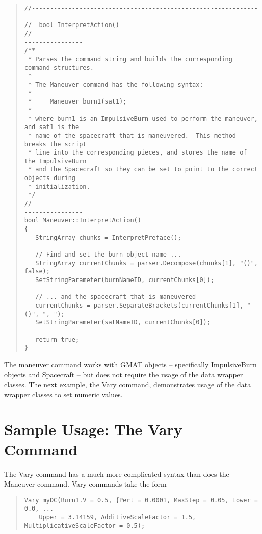 \begin{quote}
\begin{verbatim}
//------------------------------------------------------------------------------
//  bool InterpretAction()
//------------------------------------------------------------------------------
/**
 * Parses the command string and builds the corresponding command structures.
 *
 * The Maneuver command has the following syntax:
 *
 *     Maneuver burn1(sat1);
 *
 * where burn1 is an ImpulsiveBurn used to perform the maneuver, and sat1 is the
 * name of the spacecraft that is maneuvered.  This method breaks the script
 * line into the corresponding pieces, and stores the name of the ImpulsiveBurn
 * and the Spacecraft so they can be set to point to the correct objects during
 * initialization.
 */
//------------------------------------------------------------------------------
bool Maneuver::InterpretAction()
{
   StringArray chunks = InterpretPreface();

   // Find and set the burn object name ...
   StringArray currentChunks = parser.Decompose(chunks[1], "()", false);
   SetStringParameter(burnNameID, currentChunks[0]);

   // ... and the spacecraft that is maneuvered
   currentChunks = parser.SeparateBrackets(currentChunks[1], "()", ", ");
   SetStringParameter(satNameID, currentChunks[0]);

   return true;
}
\end{verbatim}
\end{quote}

\noindent The maneuver command works with GMAT objects -- specifically ImpulsiveBurn objects and
Spacecraft -- but does not require the usage of the data wrapper classes.  The next example, the
Vary command, demonstrates usage of the data wrapper classes to set numeric values.

\section{Sample Usage: The Vary Command}

The Vary command has a much more complicated syntax than does the Maneuver command.  Vary commands
take the form
\begin{quote}
\begin{verbatim}
Vary myDC(Burn1.V = 0.5, {Pert = 0.0001, MaxStep = 0.05, Lower = 0.0, ...
    Upper = 3.14159, AdditiveScaleFactor = 1.5, MultiplicativeScaleFactor = 0.5);
\end{verbatim}
\end{quote}

